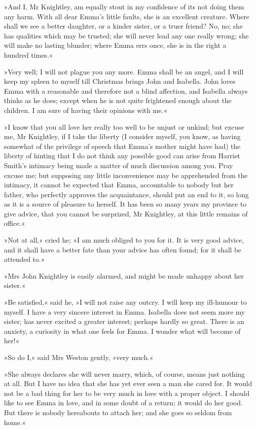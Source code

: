 »And I, Mr Knightley, am equally stout in my confidence of its not doing them any harm. With all dear Emma's little faults, she is an excellent creature. Where shall we see a better daughter, or a kinder sister, or a truer friend? No, no; she has qualities which may be trusted; she will never lead any one really wrong; she will make no lasting blunder; where Emma errs once, she is in the right a hundred times.«

»Very well; I will not plague you any more. Emma shall be an angel, and I will keep my spleen to myself till Christmas brings John and Isabella. John loves Emma with a reasonable and therefore not a blind affection, and Isabella always thinks as he does; except when he is not quite frightened enough about the children. I am sure of having their opinions with me.«

»I know that you all love her really too well to be unjust or unkind; but excuse me, Mr Knightley, if I take the liberty (I consider myself, you know, as having somewhat of the privilege of speech that Emma's mother might have had) the liberty of hinting that I do not think any possible good can arise from Harriet Smith's intimacy being made a matter of much discussion among you. Pray excuse me; but supposing any little inconvenience may be apprehended from the intimacy, it cannot be expected that Emma, accountable to nobody but her father, who perfectly approves the acquaintance, should put an end to it, so long as it is a source of pleasure to herself. It has been so many years my province to give advice, that you cannot be surprized, Mr Knightley, at this little remains of office.«

»Not at all,« cried he; »I am much obliged to you for it. It is very good advice, and it shall have a better fate than your advice has often found; for it shall be attended to.«

»Mrs John Knightley is easily alarmed, and might be made unhappy about her sister.«

»Be satisfied,« said he, »I will not raise any outcry. I will keep my ill-humour to myself. I have a very sincere interest in Emma. Isabella does not seem more my sister; has never excited a greater interest; perhaps hardly so great. There is an anxiety, a curiosity in what one feels for Emma. I wonder what will become of her!«

»So do I,« said Mrs Weston gently, »very much.«

»She always declares she will never marry, which, of course, means just nothing at all. But I have no idea that she has yet ever seen a man she cared for. It would not be a bad thing for her to be very much in love with a proper object. I should like to see Emma in love, and in some doubt of a return; it would do her good. But there is nobody hereabouts to attach her; and she goes so seldom from home.«

